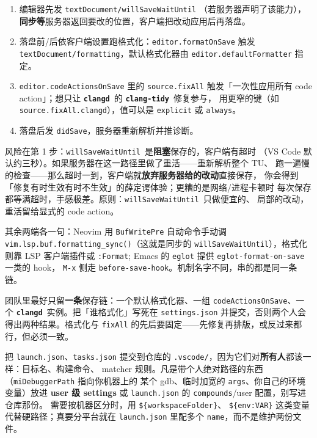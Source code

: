 \documentclass[12pt,a4paper,fontset=fandol]{ctexbook}
\newcommand{\Bk}{\discretionary{}{}{}}
\newcommand{\Lib}[1]{\textbf{\texttt{#1}}}
\newcommand{\Tidy}{\Lib{clang-tidy}}
\newcommand{\CD}{\Lib{clangd}}
\begin{document}
\begin{enumerate}
  \item 编辑器先发 \texttt{textDocument/}\Bk\texttt{willSaveWaitUntil}
        （若服务器声明了该能力），
        \textbf{同步等}服务器返回要改的位置，客户端把改动应用后再落盘。
  \item 落盘前/后依客户端设置跑格式化：\texttt{editor.{\Bk}format{\Bk}On{\Bk}Save}
        触发 \texttt{text{\Bk}Document/}\Bk\texttt{formatting}，默认格式化器由
        \texttt{editor.}\Bk\texttt{default{\Bk}Formatter} 指定。
  \item \texttt{editor.{\Bk}code{\Bk}Actions{\Bk}On{\Bk}Save} 里的 \texttt{source.{\Bk}fix{\Bk}All}
        触发「一次性应用所有 code action」；想只让 \CD\ 的 \Tidy\ 修复参与，
        用更窄的键（如 \texttt{source.fixAll.clangd}），值可以是
        \texttt{explicit} 或 \texttt{always}。
  \item 落盘后发 \texttt{didSave}，服务器重新解析并推诊断。
\end{enumerate}

风险在第 1 步：\texttt{willSaveWaitUntil}\Bk\ 是\textbf{阻塞}保存的，客户端有超时
（VS Code 默认约三秒）。如果服务器在这一路径里做了重活——重新解析整个 TU、
跑一遍慢的检查——那么超时一到，客户端就\textbf{放弃服务器给的改动}直接保存，
你会得到「修复有时生效有时不生效」的薛定谔体验；更糟的是网络/进程卡顿时
每次保存都等满超时，手感极差。原则：\texttt{willSaveWaitUntil}\Bk\ 只做便宜的、
局部的改动，重活留给显式的 code action。

其余两端各一句：Neovim 用 \texttt{BufWritePre} 自动命令手动调
\texttt{vim.lsp.buf.}\Bk\texttt{formatting\_{\Bk}sync()}（这就是同步的
\texttt{will{\Bk}Save{\Bk}Wait{\Bk}Until}），格式化则靠 LSP 客户端插件或 \texttt{:Format};
Emacs 的 \texttt{eglot} 提供 \texttt{eglot-}\Bk\texttt{format-{\Bk}on-{\Bk}save} 一类的 hook，
\texttt{M-x} 侧走 \texttt{before-{\Bk}save-{\Bk}hook}。机制名字不同，串的都是同一条链。

\begin{guideline}[title={把保存链固定成一条可复现的路径}]
团队里最好只留\textbf{一条}保存链：一个默认格式化器、一组
\texttt{codeActionsOnSave}、一个 \CD\ 实例。把「谁格式化」写死在
\texttt{settings.json} 并提交，否则两个人会得出两种结果。格式化与
\texttt{fixAll} 的先后要固定——先修复再排版，或反过来都行，但必须一致。
\end{guideline}

\begin{bestpractice}[title={调试配置只放仓库根，个人路径放 user 级}]
把 \texttt{launch.json}、\texttt{tasks.json} 提交到仓库的
\texttt{.vscode/}，因为它们对\textbf{所有人}都该一样：目标名、构建命令、
matcher 规则。凡是带个人绝对路径的东西（\texttt{miDebuggerPath} 指向你机器上的
某个 gdb、临时加宽的 \texttt{args}、你自己的环境变量）放进
\textbf{user 级 settings} 或 \texttt{launch.json} 的
\texttt{compounds}/user 配置，别写进仓库那份。
需要按机器区分时，用 \texttt{\$\{workspaceFolder\}}、
\texttt{\$\{env:VAR\}} 这类变量代替硬路径；真要分平台就在
\texttt{launch.json} 里配多个 \texttt{name}，而不是维护两份文件。
\end{bestpractice}
\end{document}
